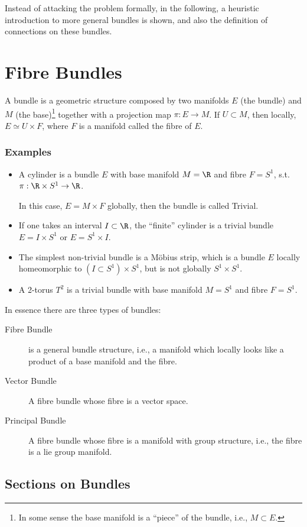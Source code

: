 Instead of attacking the problem formally, in the following, a heuristic introduction to more general bundles is shown, and also the definition of connections on these bundles.

\section{Fibre Bundles}

A bundle is a geometric structure composed by two manifolds $E$ (the bundle) and $M$ (the base)\footnote{In some sense the base manifold is a ``piece'' of the bundle, i.e., $M\subset E$.} together with a projection map $\pi:E\to M$. If $U\subset M$, then locally, $E\simeq U\times F$, where $F$ is a manifold called the fibre of $E$. 

\subsubsection*{Examples}
\begin{itemize}
\item A cylinder is a bundle $E$ with base manifold $M=\R$ and fibre $F=S^1$, s.t. $\pi:\R\times S^1\to \R$.

In this case, $E=M\times F$ globally, then the bundle is called {\sc Trivial}.
\item If one takes an interval $I\subset \R$, the ``finite'' cylinder is a trivial bundle $E=I\times S^1$ or $E=S^1\times I$.
\item The simplest non-trivial bundle is a M\"obius strip, which is a bundle $E$ locally homeomorphic to $(I\subset S^1)\times S^1$, but is not globally $S^1\times S^1$.
\item  A 2-torus $T^2$ is a trivial bundle with base manifold $M=S^1$ and fibre $F=S^1$.
\end{itemize}

In essence there are three types of bundles:
\begin{description}
\item [Fibre Bundle] is a general bundle structure, i.e., a manifold which locally looks like a product of a base manifold and the fibre.
\item [Vector Bundle] A fibre bundle whose fibre is a vector space.
\item [Principal Bundle] A fibre bundle whose fibre is a manifold with group structure, i.e., the fibre is a lie group manifold.
\end{description}

\subsection{Sections on Bundles}

